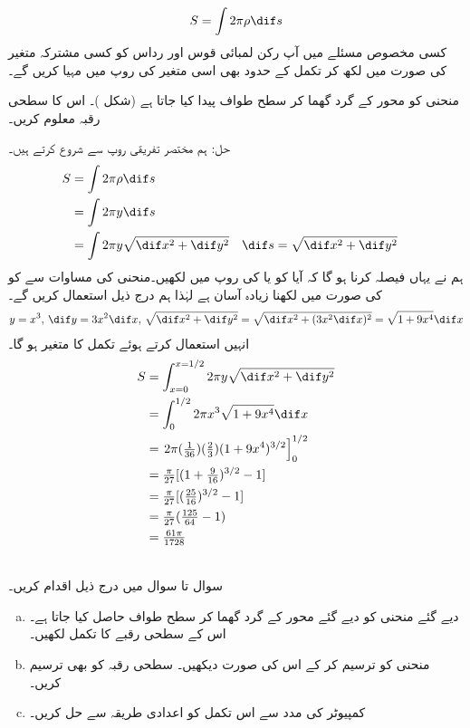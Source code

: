 \\
\begin{align*}
S=\int 2\pi \rho \dif s
\end{align*}
کسی مخصوص مسئلے میں آپ رکن لمبائی قوس  اور رداس  کو کسی مشترکہ متغیر کی صورت میں لکھ کر تکمل کے حدود بھی اسی متغیر کی روپ میں مہیا کریں گے۔ 

منحنی  کو محور  کے گرد گھما کر سطح طواف پیدا کیا جاتا ہے (شکل )۔ اس کا سطحی رقبہ معلوم کریں۔

حل:\quad
ہم مختصر تفریقی روپ سے شروع کرتے ہیں۔
\begin{align*}
S&=\int 2\pi \rho \dif s\\
&=\int 2\pi y\dif s\\
&=\int 2\pi y\sqrt{\dif x^2+\dif y^2}&&\dif s=\sqrt{\dif x^2+\dif y^2}
\end{align*} 
ہم نے یہاں فیصلہ کرنا ہو گا کہ آیا  کو  یا  کی روپ میں لکھیں۔منحنی کی مساوات  سے  کو  کی صورت میں لکھنا زیادہ آسان ہے لہٰذا ہم درج ذیل استعمال کریں گے۔
\begin{align*}
y=x^3,\, \dif y=3x^2\dif x,\, \sqrt{\dif x^2+\dif y^2}=\sqrt{\dif x^2+(3x^2\dif x)^2}=\sqrt{1+9x^4}\dif x
\end{align*}
انہیں استعمال کرتے ہوئے تکمل کا متغیر  ہو گا۔
\begin{align*}
S&=\int_{x=0}^{x=1/2}2\pi y\sqrt{\dif x^2+\dif y^2}\\
&=\int_0^{1/2}2\pi x^3\sqrt{1+9x^4}\dif x\\
&=\left.2\pi(\tfrac{1}{36})(\tfrac{2}{3})(1+9x^4)^{3/2}\right]_0^{1/2}\\
&=\tfrac{\pi}{27}[(1+\tfrac{9}{16})^{3/2}-1]\\
&=\tfrac{\pi}{27}[(\tfrac{25}{16})^{3/2}-1]\\
&=\tfrac{\pi}{27}(\tfrac{125}{64}-1)\\
&=\tfrac{61\pi}{1728}
\end{align*}

\\
سوال  تا سوال  میں درج ذیل اقدام کریں۔
\begin{enumerate}[a.]
\item
دیے گئے منحنی کو دیے گئے محور کے گرد گھما کر سطح طواف حاصل کیا جاتا ہے۔ اس کے سطحی رقبے کا تکمل لکھیں۔
\item
منحنی کو ترسیم کر کے اس کی صورت دیکھیں۔ سطحی رقبہ کو بھی ترسیم کریں۔
\item
کمپیوٹر کی مدد سے اس تکمل کو اعدادی طریقہ سے حل کریں۔  
\end{enumerate}

